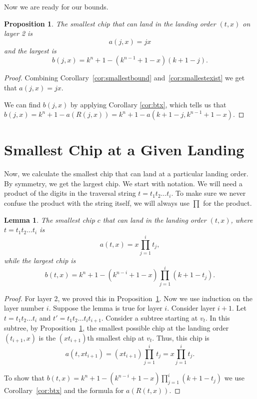 \documentclass[11pt]{article}
\newtheorem{lemma}[theorem]{Lemma} %
\newtheorem{proposition}[theorem]{Proposition}
\theoremstyle{definition}
\theoremstyle{remark}
\begin{document}
Now we are ready for our bounds.

\begin{proposition}
\label{prop:Layer2}
    The smallest chip that can land in the landing order $(t,x)$ on layer 2 is 
    \[a(j,x) = jx\]
    and the largest is
    \[b(j,x) = k^n+1 -(k^{n-1} +1-x)(k+1-j).\]
\end{proposition}

\begin{proof}
    Combining Corollary~\ref{cor:smallestbound} and~\ref{cor:smallestexist} we get that $a(j,x) = jx$.

    We can find $b(j, x)$ by applying Corollary \ref{cor:btx}, which tells us that $b(j, x) = k^n+1-a(R(j, x)) = k^n+1-a(k+1-j, k^{n-1}+1-x)$.
\end{proof}


\section{Smallest Chip at a Given Landing}
\label{sec:smallestchip}
Now, we calculate the smallest chip that can land at a particular landing order. By symmetry, we get the largest chip. We start with notation. We will need a product of the digits in the traversal string $t = t_1 t_2 \ldots t_i$. To make sure we never confuse the product with the string itself, we will always use $\prod$ for the product.

\begin{lemma}
\label{lem:smalllargechip}
    The smallest chip $c$ that can land in the landing order $(t,x)$, where $t = t_1t_2 \dots t_i$ is 
    \[a(t,x) = x \prod_{j=1}^i t_j,\]
    while the largest chip is 
    \[b(t,x) = k^n +1 -  (k^{n-i} +1 - x) \prod_{j=1}^i (k+1-t_j).\]
\end{lemma}
\begin{proof}    
    For layer 2, we proved this in Proposition~\ref{prop:Layer2}. Now we use induction on the layer number $i$. Suppose the lemma is true for layer $i$. Consider layer $i+1$. Let $t = t_1t_2 \dots t_i$ and $t' = t_1t_2 \dots t_i t_{i+1}$. Consider a subtree starting at $v_t$. In this subtree, by Proposition~\ref{prop:Layer2}, the smallest possible chip at the landing order $(t_{i+1},x)$ is the $(xt_{i+1})$th smallest chip at $v_t$. Thus, this chip is
    \[a(t,xt_{i+1}) = (xt_{i+1}) \prod_{j=1}^i t_j = x \prod_{j=1}^i t_j.\]

    To show that $b(t, x) = k^n +1-(k^{n-i}+1-x)\prod_{j=1}^i (k+1-t_j)$ we use Corollary~\ref{cor:btx} and the formula for $a(R(t, x))$.
\end{proof}
\end{document}
